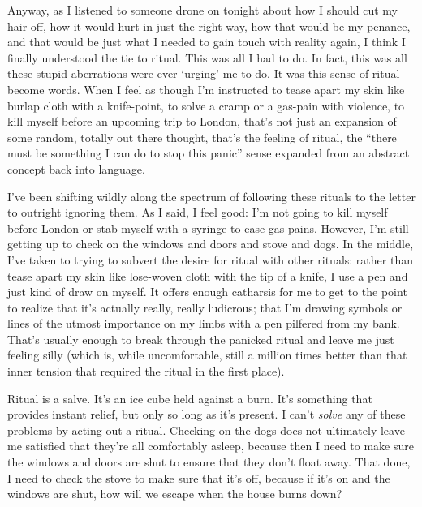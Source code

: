 \begin{leftcolumn}
Anyway, as I listened to someone drone on tonight about how I should cut my hair off, how it would hurt in just the right way, how that would be my penance, and that would be just what I needed to gain touch with reality again, I think I finally understood the tie to ritual. This was all I had to do. In fact, this was all these stupid aberrations were ever `urging' me to do. It was this sense of ritual become words. When I feel as though I'm instructed to tease apart my skin like burlap cloth with a knife-point, to solve a cramp or a gas-pain with violence, to kill myself before an upcoming trip to London, that's not just an expansion of some random, totally out there thought, that's the feeling of ritual, the ``there must be something I can do to stop this panic'' sense expanded from an abstract concept back into language.

I've been shifting wildly along the spectrum of following these rituals to the letter to outright ignoring them. As I said, I feel good: I'm not going to kill myself before London or stab myself with a syringe to ease gas-pains. However, I'm still getting up to check on the windows and doors and stove and dogs. In the middle, I've taken to trying to subvert the desire for ritual with other rituals: rather than tease apart my skin like lose-woven cloth with the tip of a knife, I use a pen and just kind of draw on myself. It offers enough catharsis for me to get to the point to realize that it's actually really, really ludicrous; that I'm drawing symbols or lines of the utmost importance on my limbs with a pen pilfered from my bank. That's usually enough to break through the panicked ritual and leave me just feeling silly (which is, while uncomfortable, still a million times better than that inner tension that required the ritual in the first place).

Ritual is a salve. It's an ice cube held against a burn. It's something that provides instant relief, but only so long as it's present. I can't \emph{solve} any of these problems by acting out a ritual. Checking on the dogs does not ultimately leave me satisfied that they're all comfortably asleep, because then I need to make sure the windows and doors are shut to ensure that they don't float away. That done, I need to check the stove to make sure that it's off, because if it's on and the windows are shut, how will we escape when the house burns down?


\end{leftcolumn}

